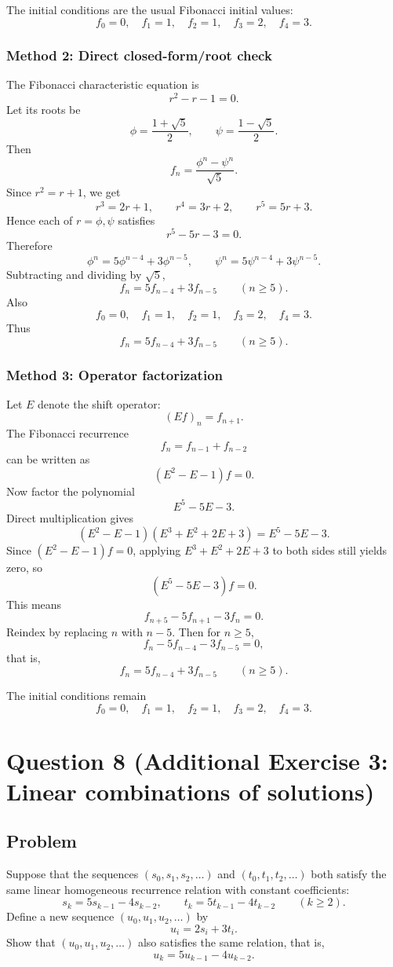 \documentclass[12pt]{article}
\begin{document}
The initial conditions are the usual Fibonacci initial values:
\[
\boxed{f_0=0,\quad f_1=1,\quad f_2=1,\quad f_3=2,\quad f_4=3.}
\]

\newpage
\subsubsection{Method 2: Direct closed-form/root check}
The Fibonacci characteristic equation is
\[
r^2-r-1=0.
\]
Let its roots be
\[
\phi=\frac{1+\sqrt5}{2},\qquad \psi=\frac{1-\sqrt5}{2}.
\]
Then
\[
f_n=\frac{\phi^n-\psi^n}{\sqrt5}.
\]
Since \(r^2=r+1\), we get
\[
r^3=2r+1,\qquad r^4=3r+2,\qquad r^5=5r+3.
\]
Hence each of \(r=\phi,\psi\) satisfies
\[
r^5-5r-3=0.
\]
Therefore
\[
\phi^n=5\phi^{n-4}+3\phi^{n-5},
\qquad
\psi^n=5\psi^{n-4}+3\psi^{n-5}.
\]
Subtracting and dividing by \(\sqrt5\),
\[
f_n=5f_{n-4}+3f_{n-5}\qquad (n\ge 5).
\]
Also
\[
f_0=0,\quad f_1=1,\quad f_2=1,\quad f_3=2,\quad f_4=3.
\]
Thus
\[
\boxed{f_n=5f_{n-4}+3f_{n-5}\qquad (n\ge 5).}
\]

\newpage
\subsubsection{Method 3: Operator factorization}
Let \(E\) denote the shift operator:
\[
(Ef)_n=f_{n+1}.
\]
The Fibonacci recurrence
\[
f_n=f_{n-1}+f_{n-2}
\]
can be written as
\[
(E^2-E-1)f=0.
\]
Now factor the polynomial
\[
E^5-5E-3.
\]
Direct multiplication gives
\[
(E^2-E-1)(E^3+E^2+2E+3)=E^5-5E-3.
\]
Since \((E^2-E-1)f=0\), applying \(E^3+E^2+2E+3\) to both sides still yields zero, so
\[
(E^5-5E-3)f=0.
\]
This means
\[
f_{n+5}-5f_{n+1}-3f_n=0.
\]
Reindex by replacing \(n\) with \(n-5\). Then for \(n\ge 5\),
\[
f_n-5f_{n-4}-3f_{n-5}=0,
\]
that is,
\[
\boxed{f_n=5f_{n-4}+3f_{n-5}\qquad (n\ge 5).}
\]

The initial conditions remain
\[
\boxed{f_0=0,\quad f_1=1,\quad f_2=1,\quad f_3=2,\quad f_4=3.}
\]

\newpage

\section{Question 8 (Additional Exercise 3: Linear combinations of solutions)}

\subsection{Problem}
Suppose that the sequences \((s_0,s_1,s_2,\dots)\) and \((t_0,t_1,t_2,\dots)\) both satisfy the same linear homogeneous recurrence relation with constant coefficients:
\[
s_k=5s_{k-1}-4s_{k-2},\qquad
t_k=5t_{k-1}-4t_{k-2}
\qquad (k\ge 2).
\]
Define a new sequence \((u_0,u_1,u_2,\dots)\) by
\[
u_i=2s_i+3t_i.
\]
Show that \((u_0,u_1,u_2,\dots)\) also satisfies the same relation, that is,
\[
u_k=5u_{k-1}-4u_{k-2}.
\]
\end{document}
